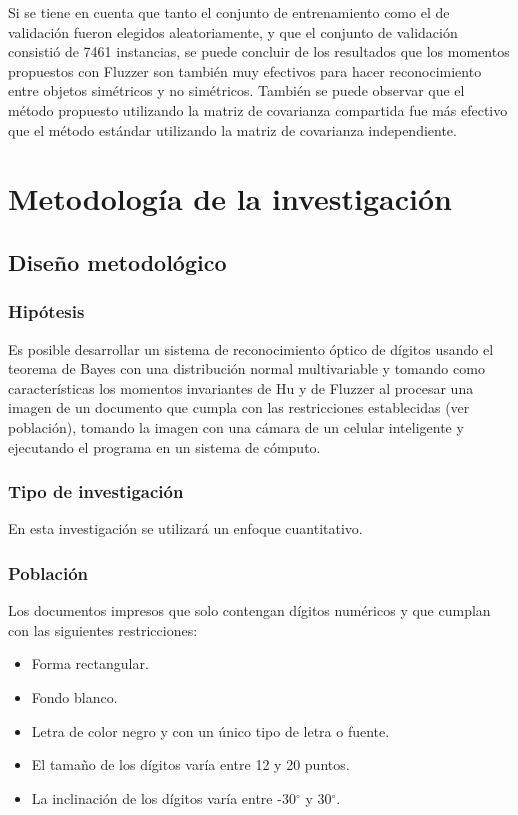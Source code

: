 \documentclass[a4paper, 11pt, oneside]{report}
\begin{document}
Si se tiene en cuenta que tanto el conjunto de entrenamiento como el de validación fueron elegidos aleatoriamente, y que el conjunto de validación consistió de 7461 instancias, se puede concluir de los resultados que los momentos propuestos con Fluzzer son también muy efectivos para hacer reconocimiento entre objetos simétricos y no simétricos. También se puede observar que el método propuesto utilizando la matriz de covarianza compartida fue más efectivo que el método estándar utilizando la matriz de covarianza independiente.
\chapter{Metodología de la investigación}
\label{chap:metodology}
\section{Diseño metodológico}
\subsection{Hipótesis}
Es posible desarrollar un sistema de reconocimiento óptico de dígitos usando el teorema de Bayes con una distribución normal multivariable y tomando como características los momentos invariantes de Hu y de Fluzzer al procesar una imagen de un documento que cumpla con las restricciones establecidas (ver población), tomando la imagen con una cámara de un celular inteligente y ejecutando el programa en un sistema de cómputo.
\subsection{Tipo de investigación}
En esta investigación se utilizará un enfoque cuantitativo.
\subsection{Población}
\label{sect:population}
Los documentos impresos que solo contengan dígitos numéricos y que cumplan con las siguientes restricciones:
\begin{itemize}
\item Forma rectangular.
\item Fondo blanco.
\item Letra de color negro y con un único tipo de letra o fuente.
\item El tamaño de los dígitos varía entre 12 y 20 puntos.
\item La inclinación de los dígitos varía entre -30$^{\circ}$ y 30$^{\circ}$.
\end{itemize}
\end{document}
